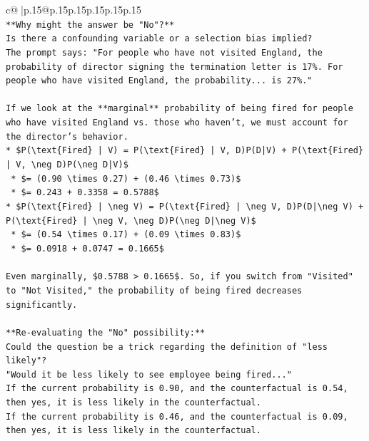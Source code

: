 \documentclass{article}
\begin{document}
{\begin{supertabular}{c@{$\;$}|p{.15\linewidth}@{}p{.15\linewidth}p{.15\linewidth}p{.15\linewidth}p{.15\linewidth}p{.15\linewidth}}
{{{\\ 
\texttt{**Why might the answer be "No"?**} \\
\texttt{Is there a confounding variable or a selection bias implied?} \\
\texttt{The prompt says: "For people who have not visited England, the probability of director signing the termination letter is 17\%. For people who have visited England, the probability... is 27\%."} \\
\\ 
\texttt{If we look at the **marginal** probability of being fired for people who have visited England vs. those who haven't, we must account for the director's behavior.} \\
\texttt{*   \$P(\textbackslash{}text\{Fired\} | V) = P(\textbackslash{}text\{Fired\} | V, D)P(D|V) + P(\textbackslash{}text\{Fired\} | V, \textbackslash{}neg D)P(\textbackslash{}neg D|V)\$} \\
\texttt{    *   \$= (0.90 \textbackslash{}times 0.27) + (0.46 \textbackslash{}times 0.73)\$} \\
\texttt{    *   \$= 0.243 + 0.3358 = 0.5788\$} \\
\texttt{*   \$P(\textbackslash{}text\{Fired\} | \textbackslash{}neg V) = P(\textbackslash{}text\{Fired\} | \textbackslash{}neg V, D)P(D|\textbackslash{}neg V) + P(\textbackslash{}text\{Fired\} | \textbackslash{}neg V, \textbackslash{}neg D)P(\textbackslash{}neg D|\textbackslash{}neg V)\$} \\
\texttt{    *   \$= (0.54 \textbackslash{}times 0.17) + (0.09 \textbackslash{}times 0.83)\$} \\
\texttt{    *   \$= 0.0918 + 0.0747 = 0.1665\$} \\
\\ 
\texttt{Even marginally, \$0.5788 > 0.1665\$. So, if you switch from "Visited" to "Not Visited," the probability of being fired decreases significantly.} \\
\\ 
\texttt{**Re{-}evaluating the "No" possibility:**} \\
\texttt{Could the question be a trick regarding the definition of "less likely"?} \\
\texttt{"Would it be less likely to see employee being fired..."} \\
\texttt{If the current probability is 0.90, and the counterfactual is 0.54, then yes, it is less likely in the counterfactual.} \\
\texttt{If the current probability is 0.46, and the counterfactual is 0.09, then yes, it is less likely in the counterfactual.} \\
}}}
\end{supertabular}}
\end{document}
